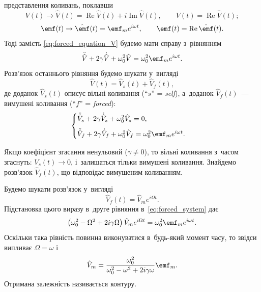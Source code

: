 представлення коливань, поклавши
\begin{equation*}
	V(t) \to \hat{V}(t) = \operatorname{Re}\hat{V}(t) + i\operatorname{Im}\hat{V}(t), \qquad
	V(t) = \operatorname{Re}\hat{V}(t);
\end{equation*}
\begin{equation*}
	\emf(t) \to \hat{\emf}(t) = \emf_m e^{i\omega t}, \qquad
	\emf(t) = \operatorname{Re}\hat{\emf}(t).
\end{equation*}
Тоді замість \eqref{eq:forced_equation_V} будемо мати справу з~рівнянням
\begin{equation*}
	\ddot{\hat{V}} + 2\gamma\dot{\hat{V}} + \omega_0^2 \hat{V} = \omega_0^2\emf_m e^{i\omega t}.
\end{equation*}
Розв'язок останнього рівняння будемо шукати у~вигляді
\begin{equation*}
	\hat{V}(t) = \hat{V}_s(t) + \hat{V}_f(t),
\end{equation*}
де доданок $\hat{V}_s(t)$ описує вільні коливання (\enquote{$s$} = \emph{self}), а~доданок $\hat{V}_f(t)$~--- вимушені коливання (\enquote{$f$} = \emph{forced}):
\begin{equation}\label{eq:forced_system}
	\begin{cases}
		\ddot{\hat{V}}_s + 2\gamma\dot{\hat{V}}_s + \omega_0^2 \hat{V}_s = 0, \\[6pt]
		\ddot{\hat{V}}_f + 2\gamma\dot{\hat{V}}_f + \omega_0^2 \hat{V}_f = \omega_0^2\emf_m e^{i\omega t}.
	\end{cases}
\end{equation}

Якщо коефіцієнт згасання ненульовий ($\gamma \neq 0$), то вільні коливання з~часом згаснуть: $V_s(t) \to 0$, і~залишаться тільки вимушені
коливання. Знайдемо розв'язок $\hat{V}_f(t)$, що відповідає вимушеним коливанням.

Будемо шукати розв'язок у~вигляді
\begin{equation*}
	\hat{V}_f(t) = \hat{V}_m e^{i\Omega t}.
\end{equation*}
Підстановка цього виразу в~друге рівняння в~\eqref{eq:forced_system} дає
\begin{equation}\label{eq:substitution_forced}
	\left(\omega_0^2 - \Omega^2 + 2i\gamma\Omega\right)\hat{V}_m e^{i\Omega t} = \omega_0^2\emf_m e^{i\omega t}.
\end{equation}
Оскільки така рівність повинна виконуватися в~будь-який момент часу, то звідси випливає $\Omega = \omega$ і
\begin{equation}\label{eq:V0_frequency_response}
	\hat{V}_m = \frac{\omega_0^2}{\omega_0^2 - \omega^2 + 2i\gamma\omega}\emf_m.
\end{equation}
Отримана залежність називається  контуру.

